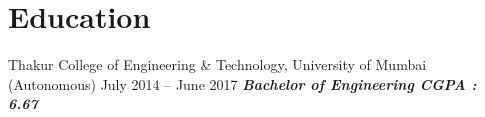\section{\textbf{Education}}
{Thakur College of Engineering \& Technology, University of Mumbai (Autonomous) \hspace{25mm} July 2014 -- June 2017}
    \hspace{0.05cm} \textbf{ \textit{Bachelor of Engineering\textbf{\hspace{130mm} \textbf{CGPA : 6.67}}}}